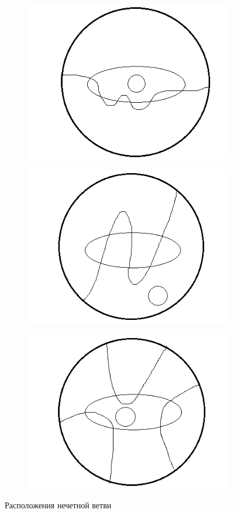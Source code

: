 \documentclass[11pt]{article}
\begin{document}
\begin{figure}[H]
     \begin{subfigure}[b]{0.2\textwidth}
    \centering
    \includegraphics[scale=0.45]{loc_odd_brunch_1.png}
    \caption{}
  \end{subfigure}
  \hspace{2cm}
  \begin{subfigure}[b]{0.2\textwidth}
    \centering
    \includegraphics[scale=0.45]{loc_odd_brunch_2.png}
    \caption{}
  \end{subfigure}
  \hspace{2cm}
  \begin{subfigure}[b]{0.2\textwidth}
    \centering
    \includegraphics[scale=0.45]{loc_odd_brunch_3.png}
    \caption{}
  \end{subfigure}
\caption{Расположения нечетной ветви}
\label{fig:loc_odd_brunch}
\end{figure}
\end{document}
